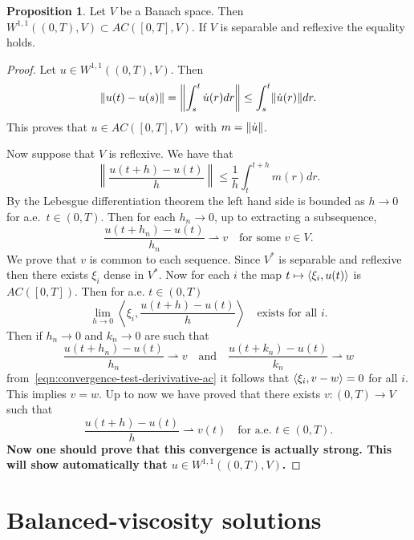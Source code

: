 \documentclass[letterpaper,oneside]{amsart}
\numberwithin{equation}{section}
\theoremstyle{definition}
\newtheorem{prop}{Proposition}[section]
\DeclarePairedDelimiter{\norm}{\lVert}{\rVert}
\DeclarePairedDelimiter{\dual}{\langle}{\rangle}
\begin{document}
\begin{prop}
\label{prop:ac-w}
Let $V$ be a Banach space. Then $W^{1,1}((0,T),V)\subset AC([0,T],V)$. If $V$ is separable and reflexive the equality holds.
\end{prop}
\begin{proof}
Let $u\in W^{1,1}((0,T),V)$. Then
\begin{equation*}
\norm{u(t)-u(s)}=\left\lVert\int_s^t\dot u(r)dr\right\rVert\le\int_s^t\norm{\dot u(r)}dr.
\end{equation*}
This proves that $u\in AC([0,T],V)$ with $m=\norm{\dot u}$.

Now suppose that $V$ is reflexive. We have that
\begin{equation*}
\left\lVert\frac{u(t+h)-u(t)}{h}\right\rVert\le\frac{1}{h}\int_t^{t+h}m(r)dr.
\end{equation*}
By the Lebesgue differentiation theorem the left hand side is bounded as $h\to 0$ for a.e.\ $t\in(0,T)$. Then for each $h_n\to 0$, up to extracting a subsequence,
\begin{equation*}
\frac{u(t+h_n)-u(t)}{h_n}\rightharpoonup v\quad\text{for some $v\in V$}.
\end{equation*}
We prove that $v$ is common to each sequence. Since $V^*$ is separable and reflexive then there exists $\xi_i$ dense in $V^*$. Now for each $i$ the map $t\mapsto\dual{\xi_i,u(t)}$ is $AC([0,T])$. Then for a.e. $t\in(0,T)$
\begin{equation}
\label{eqn:convergence-test-derivivative-ac}
\lim_{h\to0}\left\langle\xi_i,\frac{u(t+h)-u(t)}{h}\right\rangle\quad\text{exists for all $i$.}
\end{equation}
Then if $h_n\to0$ and $k_n\to 0$ are such that
\begin{equation*}
\frac{u(t+h_n)-u(t)}{h_n}\rightharpoonup v\quad\text{and}\quad\frac{u(t+k_n)-u(t)}{k_n}\rightharpoonup w
\end{equation*}
from~\eqref{eqn:convergence-test-derivivative-ac} it follows that $\dual{\xi_i,v-w}=0$ for all $i$. This implies $v=w$. Up to now we have proved that there exists $v\colon(0,T)\to V$ such that
\begin{equation*}
\frac{u(t+h)-u(t)}{h}\rightharpoonup v(t)\quad\text{for a.e. $t\in(0,T)$}.
\end{equation*}
\textbf{Now one should prove that this convergence is actually strong. This will show automatically that $u\in W^{1,1}((0,T),V)$.}
\end{proof}

\section{Balanced-viscosity solutions}
\end{document}
